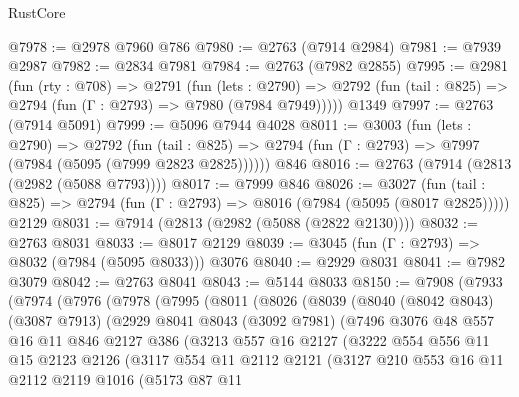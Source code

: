\begin{lexlean}{RustCore}
\begin{coremodule}
@7978 := @2978 @7960 @786
@7980 := @2763 (@7914 @2984)
@7981 := @7939 @2987
@7982 := @2834 @7981
@7984 := @2763 (@7982 @2855)
@7995 := @2981
    (fun (rty : @708) =>
    @2791
      (fun (lets : @2790) =>
      @2792 (fun (tail : @825) => @2794 (fun (Γ : @2793) => @7980 (@7984 @7949)))))
    @1349
@7997 := @2763 (@7914 @5091)
@7999 := @5096 @7944 @4028
@8011 := @3003
    (fun (lets : @2790) =>
    @2792
      (fun (tail : @825) => @2794 (fun (Γ : @2793) => @7997 (@7984 (@5095 (@7999 @2823 @2825))))))
    @846
@8016 := @2763 (@7914 (@2813 (@2982 (@5088 @7793))))
@8017 := @7999 @846
@8026 := @3027
    (fun (tail : @825) => @2794 (fun (Γ : @2793) => @8016 (@7984 (@5095 (@8017 @2825)))))
    @2129
@8031 := @7914 (@2813 (@2982 (@5088 (@2822 @2130))))
@8032 := @2763 @8031
@8033 := @8017 @2129
@8039 := @3045 (fun (Γ : @2793) => @8032 (@7984 (@5095 @8033))) @3076
@8040 := @2929 @8031
@8041 := @7982 @3079
@8042 := @2763 @8041
@8043 := @5144 @8033
@8150 := @7908
    (@7933
      (@7974
        (@7976
          (@7978
            (@7995
              (@8011
                (@8026
                  (@8039
                    (@8040
                      (@8042 @8043)
                      (@3087 @7913)
                      (@2929
                        @8041
                        @8043
                        (@3092 @7981)
                        (@7496
                          @3076
                          @48
                          @557
                          @16
                          @11
                          @846
                          @2127
                          @386
                          (@3213
                            @557
                            @16
                            @2127
                            (@3222
                              @554
                              @556
                              @11
                              @15
                              @2123
                              @2126
                              (@3117
                                @554
                                @11
                                @2112
                                @2121
                                (@3127
                                  @210
                                  @553
                                  @16
                                  @11
                                  @2112
                                  @2119
                                  @1016
                                  (@5173
                                    @87
                                    @11

\end{coremodule}
\end{lexlean}
